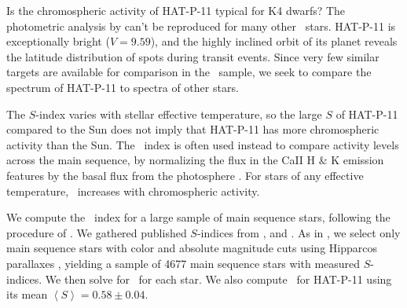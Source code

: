 Is the chromospheric activity of HAT-P-11 typical for K4 dwarfs? The photometric analysis by \citet{Morris2017} can't be reproduced for many other \kepler\ stars. HAT-P-11 is exceptionally bright ($V=9.59$), and the highly inclined orbit of its planet reveals the latitude distribution of spots during transit events. Since very few similar targets are available for comparison in the \kepler\ sample, we seek to compare the spectrum of HAT-P-11 to spectra of other stars.

The $S$-index varies with stellar effective temperature, so the large $S$ of HAT-P-11 compared to the Sun does not imply that HAT-P-11 has more chromospheric activity than the Sun. The \rprime\ index is often used instead to compare activity levels across the main sequence, by normalizing the flux in the CaII H \& K emission features by the basal flux from the photosphere \citep{Noyes1984}. For stars of any effective temperature, \rprime\ increases with chromospheric activity.

We compute the \rprime\ index for a large sample of main sequence stars, following the procedure of \citet{Mittag2013}. We gathered published $S$-indices from \citet{Duncan1991}, \citet{Wright2004} and \citet{Isaacson2010}. As in \citet{Mittag2013}, we select only main sequence stars with color and absolute magnitude cuts using Hipparcos parallaxes \citep{Perryman1997}, yielding a sample of 4677 main sequence stars with measured $S$-indices. We then solve for \rprime\ for each star. We also compute \rprime\ for HAT-P-11 using its mean $\left < S \right> = 0.58 \pm 0.04$.

